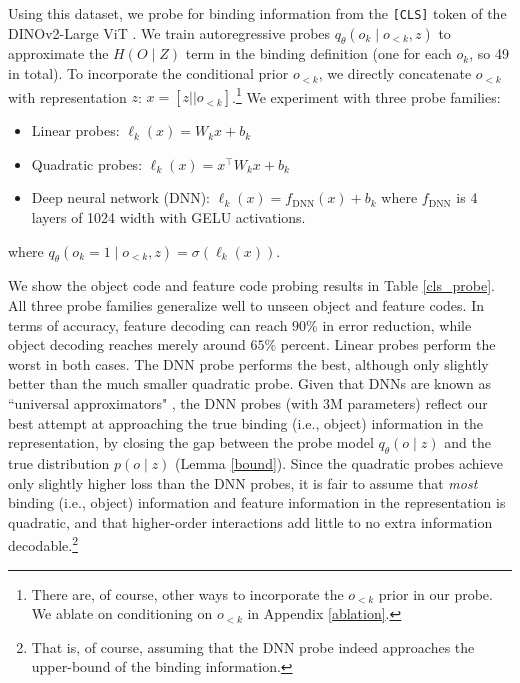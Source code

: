 \documentclass{article}
\theoremstyle{plain}
\theoremstyle{definition}
\theoremstyle{remark}
\begin{document}
Using this dataset, we probe for binding information from the \texttt{[CLS]} token of the DINOv2-Large ViT \cite{oquab2024dinov2learningrobustvisual}. We train autoregressive probes $q_\theta(o_k\mid o_{<k}, z)$ to approximate the $H(O\mid Z)$ term in the binding definition (one for each $o_k$, so 49 in total). To incorporate the conditional prior $o_{<k}$, we directly concatenate $o_{<k}$ with representation $z$: $x=[z || o_{<k}]$.\footnote{There are, of course, other ways to incorporate the $o_{<k}$ prior in our probe. We ablate on conditioning on $o_{<k}$ in Appendix \ref{ablation}.} We experiment with three probe families:
\begin{itemize}
    \item Linear probes: $\ell_k(x)=W_kx+b_k$
    \item Quadratic probes: $\ell_k(x)=x^\top W_kx+b_k$
    \item Deep neural network (DNN): $\ell_k(x)=f_{\mathrm{DNN}}(x)+b_k$ where $f_{\mathrm{DNN}}$ is 4 layers of 1024 width with GELU activations.
\end{itemize}
where $
q_\theta(o_k=1 \mid o_{<k}, z)
=
\sigma(\ell_k(x)).$

We show the object code and feature code probing results in Table \ref{cls_probe}. All three probe families generalize well to unseen object and feature codes. In terms of accuracy, feature decoding can reach $90\%$ in error reduction, while object decoding reaches merely around $65\%$ percent. Linear probes perform the worst in both cases. The DNN probe performs the best, although only slightly better than the much smaller quadratic probe. Given that DNNs are known as ``universal approximators" \cite{HORNIK1989359}, the DNN probes (with 3M parameters) reflect our best attempt at approaching the true binding (i.e., object) information in the representation, by closing the gap between the probe model $q_{\theta}(o\mid z)$ and the true distribution $p(o\mid z)$ (Lemma \ref{bound}). Since the quadratic probes achieve only slightly higher loss than the DNN probes, it is fair to assume that \textit{most} binding (i.e., object) information and feature information in the representation is quadratic, and that higher-order interactions add little to no extra information decodable.\footnote{That is, of course, assuming that the DNN probe indeed approaches the upper-bound of the binding information.}
\end{document}
